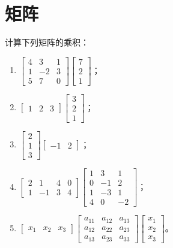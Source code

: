 \section{矩阵}


\begin{problem}\label{problem-1.1}
计算下列矩阵的乘积：

\begin{enumerate}
    \item \(\begin{bmatrix}
              4 & 3 & 1 \\1&-2&3\\5&7&0
          \end{bmatrix}\begin{bmatrix}
              7 \\2\\1
          \end{bmatrix}\)；
    \item \(\begin{bmatrix}1&2&3\end{bmatrix}\begin{bmatrix}3\\2\\1\end{bmatrix}\)；
    \item \(\begin{bmatrix}2\\1\\3\end{bmatrix}\begin{bmatrix}-1&2\end{bmatrix}\)；
    \item \(\begin{bmatrix}
              2 & 1  & 4 & 0 \\
              1 & -1 & 3 & 4
          \end{bmatrix}\begin{bmatrix}
              1 & 3  & 1  \\
              0 & -1 & 2  \\
              1 & -3 & 1  \\
              4 & 0  & -2
          \end{bmatrix}\)；
    \item \(\begin{bmatrix}
              x_1 & x_2 & x_3
          \end{bmatrix}
          \begin{bmatrix}
              a_{11} & a_{12} & a_{13} \\
              a_{12} & a_{22} & a_{23} \\
              a_{13} & a_{23} & a_{33}
          \end{bmatrix}
          \begin{bmatrix}
              x_1 \\x_2\\x_3
          \end{bmatrix}\)。
\end{enumerate}
\end{problem}
